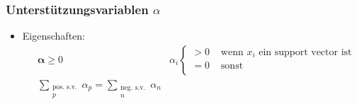 \begin{frame}
    \frametitle{Unterstützungsvariablen $\alpha$}

    \begin{itemize}
        \item Eigenschaften:
            \begin{align*}
                & \boldsymbol{\alpha} \geq 0 & \alpha_i \begin{cases}
                    > 0 & \text{ wenn } x_i \text{ ein support vector ist} \\
                    = 0 & \text{ sonst} \\
                \end{cases} \\
                & \sum\limits_{\substack{ \text{pos. s.v.} \\ p}} \alpha_p  = \sum\limits_{\substack{ \text{neg. s.v.} \\ n}} \alpha_n \\
            \end{align*}
    \end{itemize}

    \vspace{3mm}


\end{frame}
